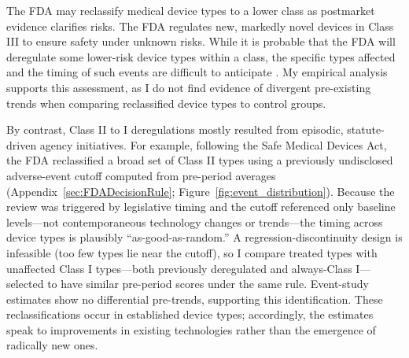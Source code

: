 \documentclass[letterpaper,12pt]{article}
\theoremstyle{definition}
\begin{document}
The FDA may reclassify medical device types to a lower class as postmarket evidence clarifies risks.\footnotemark {} The FDA regulates new, markedly novel devices in Class III to ensure safety under unknown risks.\footnotemark {}  While it is probable that the FDA will deregulate some lower-risk device types within a class, the specific types affected and the timing of such events are difficult to anticipate \citep{Makower:2010,powell2018changing}.\footnotemark {} My empirical analysis supports this assessment, as I do not find evidence of divergent pre-existing trends when comparing reclassified device types to control groups. 


By contrast, Class II to I deregulations mostly resulted from episodic, statute-driven agency initiatives. For example, following the Safe Medical Devices Act, the FDA reclassified a broad set of Class II types using a previously undisclosed adverse-event cutoff computed from pre-period averages \citep{FR60:38903} (Appendix~\ref{sec:FDADecisionRule}; Figure~\ref{fig:event_distribution}). Because the review was triggered by legislative timing and the cutoff referenced only baseline levels---not contemporaneous technology changes or trends---the timing across device types is plausibly ``as-good-as-random.'' A regression-discontinuity design is infeasible (too few types lie near the cutoff), so I compare treated types with unaffected Class I types---both previously deregulated and always-Class I---selected to have similar pre-period scores under the same rule. Event-study estimates show no differential pre-trends, supporting this identification. These reclassifications occur in established device types; accordingly, the estimates speak to improvements in existing technologies rather than the emergence of radically new ones.
\end{document}
